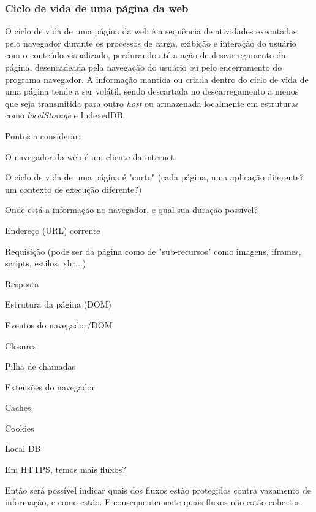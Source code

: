 \subsubsection{Ciclo de vida de uma página da web}

O ciclo de vida de uma página da web é a sequência de atividades executadas pelo navegador durante os processos de carga, exibição e  interação do usuário com o conteúdo visualizado, perdurando até a ação de descarregamento da página, desencadeada pela navegação do usuário ou pelo encerramento do programa navegador. A informação mantida ou criada dentro do ciclo de vida de uma página tende a ser volátil, sendo descartada no descarregamento a menos que seja transmitida para outro \textit{host} ou armazenada localmente em estruturas como \textit{localStorage} e IndexedDB.

\begin{todo}
Pontos a considerar:

\begin{alineas}
	\item O navegador da web é um cliente da internet.
	\item O ciclo de vida de uma página é "curto" (cada página, uma aplicação diferente? um contexto de execução diferente?)
	\item Onde está a informação no navegador, e qual sua duração possível?
	\begin{alineas}
		\item Endereço (URL) corrente
		\item Requisição (pode ser da página como de "sub-recursos" como imagens, iframes, scripts, estilos, xhr...)
		\item Resposta
		\item Estrutura da página (DOM)
		\item Eventos do navegador/DOM
		\item Closures
		\item Pilha de chamadas
		\item Extensões do navegador
		\item Caches
		\item Cookies
		\item Local DB
		\item Em HTTPS, temos mais fluxos?
	\end{alineas}
\end{alineas}

Então será possível indicar quais dos fluxos estão protegidos contra vazamento de informação, e como estão. E consequentemente quais fluxos não estão cobertos.
\end{todo}
